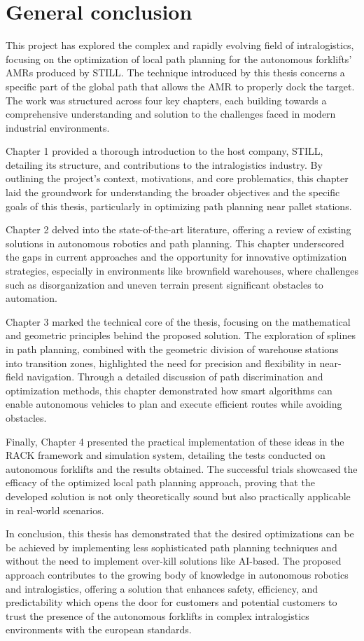 \chapter*{General conclusion}

This project has explored the complex and rapidly evolving field of intralogistics, focusing on the optimization of 
local path planning for the autonomous forklifts' AMRs produced by STILL. The technique introduced by this thesis 
concerns a specific part of the global path that allows the AMR to properly dock the target. The work was structured 
across four key chapters, each building towards a comprehensive understanding and solution to the challenges faced 
in modern industrial environments.

Chapter 1 provided a thorough introduction to the host company, STILL, detailing its structure, and contributions 
to the intralogistics industry. By outlining the project’s context, motivations, and core problematics, this chapter 
laid the groundwork for understanding the broader objectives and the specific goals of this thesis, particularly 
in optimizing path planning near pallet stations.

\noindent Chapter 2 delved into the state-of-the-art literature, offering a review of existing solutions in autonomous 
robotics and path planning. This chapter underscored the gaps in current approaches and the opportunity for 
innovative optimization strategies, especially in environments like brownfield warehouses, where challenges such 
as disorganization and uneven terrain present significant obstacles to automation.

\noindent Chapter 3 marked the technical core of the thesis, focusing on the mathematical and geometric principles behind 
the proposed solution. The exploration of splines in path planning, combined with the geometric division of 
warehouse stations into transition zones, highlighted the need for precision and flexibility in near-field 
navigation. Through a detailed discussion of path discrimination and optimization methods, this chapter 
demonstrated how smart algorithms can enable autonomous vehicles to plan and execute efficient routes 
while avoiding obstacles.

\noindent Finally, Chapter 4 presented the practical implementation of these ideas in the RACK framework and simulation 
system, detailing the tests conducted on autonomous forklifts and the results obtained. The successful trials 
showcased the efficacy of the optimized local path planning approach, proving that the developed solution is 
not only theoretically sound but also practically applicable in real-world scenarios.

In conclusion, this thesis has demonstrated that the desired optimizations can be be achieved by implementing less sophisticated path planning techniques and without the need to implement over-kill solutions like AI-based. The proposed approach contributes to the growing body of knowledge in autonomous robotics and intralogistics, offering a solution that enhances safety, efficiency, and predictability which opens the door for customers and potential customers to trust the presence of the autonomous forklifts in complex intralogistics environments with the european standards.